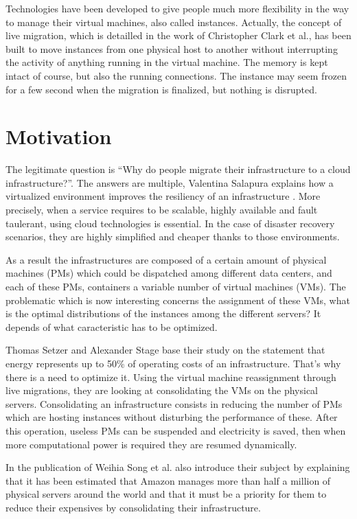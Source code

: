 \documentclass[a4paper,11pt]{article}
\begin{document}
Technologies have been developed to give people much more flexibility
in the way to manage their virtual machines, also called instances. Actually,
the concept of live migration, which is detailled in the work of Christopher
Clark et al.\cite{livemigration}, has been built to move instances from one
physical host to another without interrupting the activity of anything running
in the virtual machine. The memory is kept intact of course, but also the
running connections.  The instance may seem frozen for a few second when the
migration is finalized, but nothing is disrupted.

\section{Motivation}

The legitimate question is ``Why do people migrate their infrastructure to a
cloud infrastructure?''. The answers are multiple, Valentina Salapura explains
how a virtualized environment improves the resiliency of an
infrastructure \cite{virtresiliency}. More precisely, when a service requires
to be scalable, highly available and fault taulerant, using cloud technologies
is essential. In the case of disaster recovery scenarios, they are highly
simplified and cheaper thanks to those environments.

As a result the infrastructures are composed of a certain amount of physical
machines (PMs) which could be dispatched among different data centers, and each
of these PMs, containers a variable number of virtual machines (VMs). The
problematic which is now interesting concerns the assignment of these VMs, what
is the optimal distributions of the instances among the different servers? It
depends of what caracteristic has to be optimized.

Thomas Setzer and Alexander Stage base their study on the statement that energy
represents up to 50\% of operating costs of an infrastructure. That's why there
is a need to optimize it. Using the virtual machine reassignment through live
migrations, they are looking at consolidating the VMs on the physical servers.
Consolidating an infrastructure consists in reducing the number of PMs which
are hosting instances without disturbing the performance of these.  After this
operation, useless PMs can be suspended and electricity is saved, then when
more computational power is required they are resumed dynamically.

In the publication of Weihia Song et al.\cite{reassignment:binpacking1} also
introduce their subject by explaining that it has been estimated that Amazon
manages more than half a million of physical servers around the world and that
it must be a priority for them to reduce their expensives by consolidating their
infrastructure.
\end{document}
